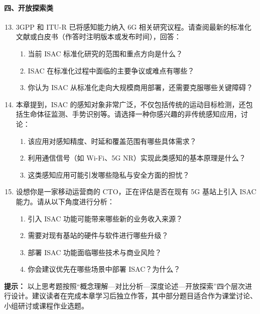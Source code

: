 \paragraph{四、开放探索类}
\begin{enumerate}
    \setcounter{enumi}{12}
    \item 3GPP 和 ITU-R 已将感知能力纳入 6G 相关研究议程。请查阅最新的标准化文献或白皮书（作答时注明版本或发布时间），回答：
    \begin{enumerate}
        \item 当前 ISAC 标准化研究的范围和重点方向是什么？
        \item ISAC 在标准化过程中面临的主要争议或难点有哪些？
        \item 你认为 ISAC 从标准化走向大规模商用部署，还需要克服哪些关键障碍？
    \end{enumerate}

    \item 本章提到，ISAC 的感知对象非常广泛，不仅包括传统的运动目标检测，还包括生命体征监测、手势识别等。请选择一种你感兴趣的非传统感知应用，讨论：
    \begin{enumerate}
        \item 该应用对感知精度、时延和覆盖范围有哪些具体需求？
        \item 利用通信信号（如 Wi-Fi、5G NR）实现此类感知的基本原理是什么？
        \item 这类感知应用可能引发哪些隐私与安全方面的担忧？
    \end{enumerate}

    \item 设想你是一家移动运营商的 CTO，正在评估是否在现有 5G 基站上引入 ISAC 能力。请从以下角度进行分析：
    \begin{enumerate}
        \item 引入 ISAC 功能可能带来哪些新的业务收入来源？
        \item 需要对现有基站的硬件与软件进行哪些升级？
        \item 部署 ISAC 功能面临哪些技术与商业风险？
        \item 你会建议优先在哪些场景中部署 ISAC？为什么？
    \end{enumerate}
\end{enumerate}

\noindent\textbf{提示：} 以上思考题按照“概念理解—对比分析—深度论述—开放探索”四个层次进行设计。建议读者在完成本章学习后独立作答，其中部分题目适合作为课堂讨论、小组研讨或课程作业选题。
